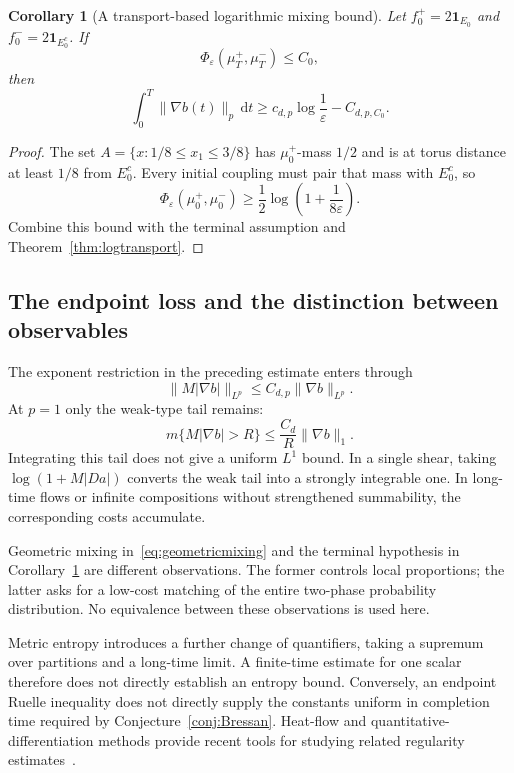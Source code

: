 \documentclass[review,12pt,times,a4paper,nopreprintline]{elsarticle}
\theoremstyle{plain}
\newtheorem{corollary}[theorem]{Corollary}
\theoremstyle{definition}
\theoremstyle{remark}
\newcommand{\dd}{\,\mathrm d}
\numberwithin{equation}{section}
\begin{document}
\begin{corollary}[A transport-based logarithmic mixing bound]\label{cor:transportmixing}
Let $f_0^+=2\mathbf1_{E_0}$ and $f_0^-=2\mathbf1_{E_0^c}$. If
\[
 \Phi_\varepsilon(\mu_T^+,\mu_T^-)\leq C_0,
\]
then
\begin{equation}\label{eq:transportmixing}
 \int_0^T\|\nabla b(t)\|_p\dd t
 \geq c_{d,p}\log\frac1\varepsilon-C_{d,p,C_0}.
\end{equation}
\end{corollary}
\begin{proof}
The set $A=\{x:1/8\leq x_1\leq3/8\}$ has $\mu_0^+$-mass $1/2$ and is at torus distance at least $1/8$ from $E_0^c$. Every initial coupling must pair that mass with $E_0^c$, so
\[
 \Phi_\varepsilon(\mu_0^+,\mu_0^-)
 \geq\frac12\log\left(1+\frac1{8\varepsilon}\right).
\]
Combine this bound with the terminal assumption and Theorem~\ref{thm:logtransport}.
\end{proof}

\subsection{The endpoint loss and the distinction between observables}
The exponent restriction in the preceding estimate enters through
\[
 \|M|\nabla b|\|_{L^p}\leq C_{d,p}\|\nabla b\|_{L^p}.
\]
At $p=1$ only the weak-type tail remains:
\begin{equation}\label{eq:weakone}
 m\{M|\nabla b|>R\}\leq\frac{C_d}{R}\|\nabla b\|_1.
\end{equation}
Integrating this tail does not give a uniform $L^1$ bound. In a single shear, taking $\log(1+M|Da|)$ converts the weak tail into a strongly integrable one. In long-time flows or infinite compositions without strengthened summability, the corresponding costs accumulate.

Geometric mixing in~\eqref{eq:geometricmixing} and the terminal hypothesis in Corollary~\ref{cor:transportmixing} are different observations. The former controls local proportions; the latter asks for a low-cost matching of the entire two-phase probability distribution. No equivalence between these observations is used here.

Metric entropy introduces a further change of quantifiers, taking a supremum over partitions and a long-time limit. A finite-time estimate for one scalar therefore does not directly establish an entropy bound. Conversely, an endpoint Ruelle inequality does not directly supply the constants uniform in completion time required by Conjecture~\ref{conj:Bressan}. Heat-flow and quantitative-differentiation methods provide recent tools for studying related regularity estimates~\cite{BCDPJ}.
\end{document}

